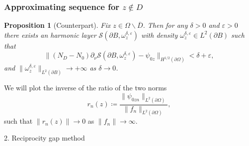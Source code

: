 \documentclass[10pt]{beamer}
\newtheorem{proposition}[subsection]{Proposition}
\theoremstyle{plain}
\theoremstyle{plain}
\let\epsilon\varepsilon
\begin{document}
\begin{frame}
 \frametitle{Approximating sequence for $z\notin D$}
 \begin{proposition}[Counterpart]
\label{prop:lsm-counterpart}
Fix $z \in \Omega\backslash\overline{D}$. Then for any $\delta>0$ and $\epsilon > 0$ there exists an harmonic layer $\mathcal{S}(\partial B, \omega^{\delta, \epsilon}_z)$ with density $\omega^{\delta, \epsilon}_z\in L^2(\partial B)$ such that
\begin{equation}
 \|({N_D} - {N_0})\partial_\nu\mathcal{S}(\partial B, \omega^{\delta,\epsilon}_z) - \psi_{0z}\|_{H^{1/2}(\partial\Omega)} < \delta + \epsilon,
\end{equation}
and $\|\omega^{\delta, \epsilon}_z\|_{L^2(\partial B)}\to + \infty$ as $\delta\to 0$.
\end{proposition}
We will plot the inverse of the ratio of the two norms
\begin{equation}
 r_n(z)\coloneqq\frac{\|\psi_{0zn}\|_{L^2(\partial \Omega)}}{\|f_n\|_{L^2(\partial \Omega)}},
\end{equation}
such that $\|r_n(z)\|\to 0$ as $\|f_n\|\to \infty$.

\end{frame}
\begin{frame}[noframenumbering]
\begin{center}
\Large
 2. Reciprocity gap method
\end{center}
\end{frame}
\end{document}
